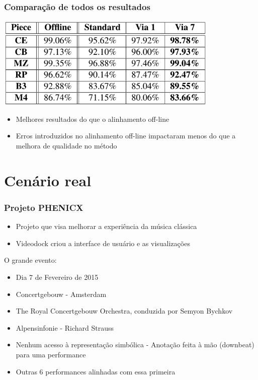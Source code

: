 \documentclass[serif,mathserif]{beamer}
\begin{document}
\begin{frame}
  \frametitle{Comparação de todos os resultados}
  \begin{center}
    \includegraphics[width=0.8\textwidth]{src/img/4-Table6-1.png}
  \end{center}
  \begin{itemize}
    \item Melhores resultados do que o alinhamento off-line\pause
    \item Erros introduzidos no alinhamento off-line impactaram menos do que a melhora de qualidade no método
  \end{itemize}
\end{frame}

\section{Cenário real}
\begin{frame}
  \frametitle{Projeto PHENICX}
  \begin{itemize}
    \item Projeto que visa melhorar a experiência da música clássica\pause
    \item Videodock criou a interface de usuário e as visualizações \pause
  \end{itemize}
  O grande evento: \pause
  \begin{itemize}
    \item Dia 7 de Fevereiro de 2015\pause
    \item Concertgebouw - Amsterdam\pause
    \item The Royal Concertgebouw Orchestra, conduzida por Semyon Bychkov\pause
    \item Alpensinfonie - Richard Strauss\pause
    \item Nenhum acesso à representação simbólica - Anotação feita à mão (downbeat) para uma performance\pause
    \item Outras 6 performances alinhadas com essa primeira
  \end{itemize}
\end{frame}
\end{document}
